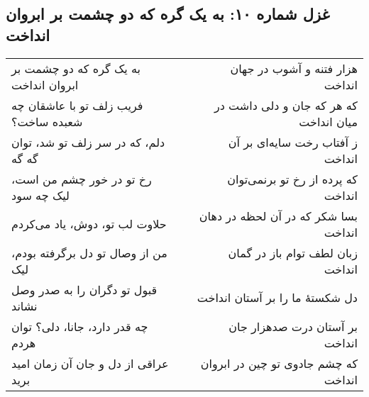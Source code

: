 \begin{center}
\section*{غزل شماره ۱۰: به یک گره که دو چشمت بر ابروان انداخت}
\label{sec:010}
\begin{longtable}{l p{0.5cm} r}
به یک گره که دو چشمت بر ابروان انداخت
&&
هزار فتنه و آشوب در جهان انداخت
\\
فریب زلف تو با عاشقان چه شعبده ساخت؟
&&
که هر که جان و دلی داشت در میان انداخت
\\
دلم، که در سر زلف تو شد، توان گه گه
&&
ز آفتاب رخت سایه‌ای بر آن انداخت
\\
رخ تو در خور چشم من است، لیک چه سود
&&
که پرده از رخ تو برنمی‌توان انداخت
\\
حلاوت لب تو، دوش، یاد می‌کردم
&&
بسا شکر که در آن لحظه در دهان انداخت
\\
من از وصال تو دل برگرفته بودم، لیک
&&
زبان لطف توام باز در گمان انداخت
\\
قبول تو دگران را به صدر وصل نشاند
&&
دل شکستهٔ ما را بر آستان انداخت
\\
چه قدر دارد، جانا، دلی؟ توان هردم
&&
بر آستان درت صدهزار جان انداخت
\\
عراقی از دل و جان آن زمان امید برید
&&
که چشم جادوی تو چین در ابروان انداخت
\\
\end{longtable}
\end{center}
